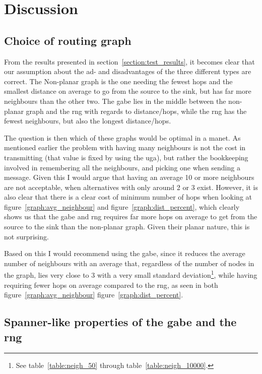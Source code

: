 \section{Discussion}
\label{section:discussion}

\subsection{Choice of routing graph}

From the results presented in section~\ref{section:test_results}, it becomes clear that our assumption about the ad- and disadvantages of the three different types are correct. The Non-planar graph is the one needing the fewest hops and the smallest distance on average to go from the source to the sink, but has far more neighbours than the other two. The \ac{gabe} lies in the middle between the non-planar graph and the \ac{rng} with regards to distance/hops, while the \ac{rng} has the fewest neighbours, but also the longest distance/hops. 

The question is then which of these graphs would be optimal in a \ac{manet}. As mentioned earlier the problem with having many neighbours is not the cost in transmitting (that value is fixed by using the \ac{uga}), but rather the bookkeeping involved in remembering all the neighbours, and picking one when sending a message. Given this I would argue that having an average 10 or more neighbours are not acceptable, when alternatives with only around 2 or 3 exist. However, it is also clear that there is a clear cost of minimum number of hops when looking at figure~\ref{graph:avg_neighbour} and figure~\ref{graph:dist_percent}, which clearly shows us that the \ac{gabe} and \ac{rng} requires far more hops on average to get from the source to the sink than the non-planar graph. Given their planar nature, this is not surprising. 

Based on this I would recommend using the \ac{gabe}, since it reduces the average number of neighbours with an average that, regardless of the number of nodes in the graph, lies very close to 3 with a very small standard deviation\footnote{See table~\ref{table:neigh_50} through table~\ref{table:neigh_10000}.}, while having requiring fewer hops on average compared to the \ac{rng}, as seen in both figure~\ref{graph:avg_neighbour} figure~\ref{graph:dist_percent}.

\subsection{Spanner-like properties of the \ac{gabe} and the \ac{rng}}

